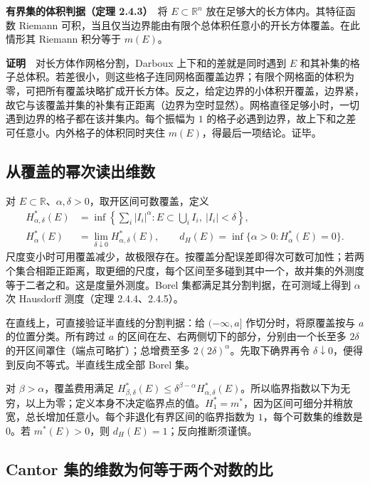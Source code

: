 \documentclass[11pt,a4paper]{article}
\begin{document}
\textbf{有界集的体积判据（定理 2.4.3）}　将 \(E\subset\mathbb R^n\) 放在足够大的长方体内。其特征函数 Riemann 可积，当且仅当边界能由有限个总体积任意小的开长方体覆盖。在此情形其 Riemann 积分等于 \(m(E)\)。

\textbf{证明}　对长方体作网格分割，Darboux 上下和的差就是同时遇到 \(E\) 和其补集的格子总体积。若差很小，则这些格子连同网格面覆盖边界；有限个网格面的体积为零，可把所有覆盖块略扩成开长方体。反之，给定边界的小体积开覆盖，边界紧，故它与该覆盖并集的补集有正距离（边界为空时显然）。网格直径足够小时，一切遇到边界的格子都在该并集内。每个振幅为 \(1\) 的格子必遇到边界，故上下和之差可任意小。内外格子的体积同时夹住 \(m(E)\)，得最后一项结论。证毕。

\subsection*{从覆盖的幂次读出维数}\label{ux4eceux8986ux76d6ux7684ux5e42ux6b21ux8bfbux51faux7ef4ux6570}

对 \(E\subset\mathbb R\)、\(\alpha,\delta>0\)，取开区间可数覆盖，定义 \[
\begin{aligned}
H^*_{\alpha,\delta}(E)&=\inf\left\{\sum_i |I_i|^\alpha:
  E\subset\bigcup_i I_i,\ |I_i|<\delta\right\},\\
H^*_\alpha(E)&=\lim_{\delta\downarrow0}H^*_{\alpha,\delta}(E),\qquad
d_H(E)=\inf\{\alpha>0:H^*_\alpha(E)=0\}.
\end{aligned}
\] 尺度变小时可用覆盖减少，故极限存在。按覆盖分配误差即得次可数可加性；若两个集合相距正距离，取更细的尺度，每个区间至多碰到其中一个，故并集的外测度等于二者之和。这是度量外测度。Borel 集都满足其分割判据，在可测域上得到 \(\alpha\) 次 Hausdorff 测度（定理 2.4.4、2.4.5）。

在直线上，可直接验证半直线的分割判据：给 \((-\infty,a]\) 作切分时，将原覆盖按与 \(a\) 的位置分类。所有跨过 \(a\) 的区间在左、右两侧切下的部分，分别由一个长至多 \(2\delta\) 的开区间罩住（端点可略扩）；总增费至多 \(2(2\delta)^\alpha\)。先取下确界再令 \(\delta\downarrow0\)，便得到反向不等式。半直线生成全部 Borel 集。

对 \(\beta>\alpha\)，覆盖费用满足 \(H^*_{\beta,\delta}(E)\leq\delta^{\beta-\alpha} H^*_{\alpha,\delta}(E)\)。所以临界指数以下为无穷，以上为零；定义本身不决定临界点的值。\(H^*_1=m^*\)，因为区间可细分并稍放宽，总长增加任意小。每个非退化有界区间的临界指数为 \(1\)，每个可数集的维数是 \(0\)。若 \(m^*(E)>0\)，则 \(d_H(E)=1\)；反向推断须谨慎。

\subsection*{Cantor 集的维数为何等于两个对数的比}\label{cantor-ux96c6ux7684ux7ef4ux6570ux4e3aux4f55ux7b49ux4e8eux4e24ux4e2aux5bf9ux6570ux7684ux6bd4}
\end{document}
